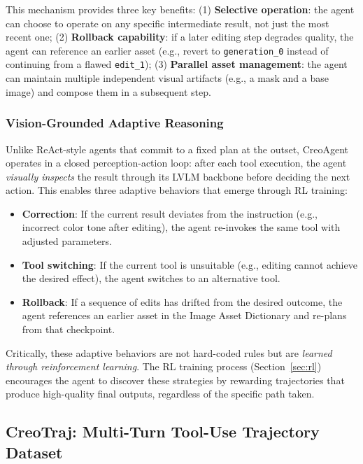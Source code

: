 \documentclass[11pt]{article}
\begin{document}
This mechanism provides three key benefits: (1) \textbf{Selective operation}: the agent can choose to operate on any specific intermediate result, not just the most recent one; (2) \textbf{Rollback capability}: if a later editing step degrades quality, the agent can reference an earlier asset (e.g., revert to \texttt{generation\_0} instead of continuing from a flawed \texttt{edit\_1}); (3) \textbf{Parallel asset management}: the agent can maintain multiple independent visual artifacts (e.g., a mask and a base image) and compose them in a subsequent step.

\subsubsection{Vision-Grounded Adaptive Reasoning}

Unlike ReAct-style agents \cite{yao2022react} that commit to a fixed plan at the outset, CreoAgent operates in a closed perception-action loop: after each tool execution, the agent \textit{visually inspects} the result through its LVLM backbone before deciding the next action. This enables three adaptive behaviors that emerge through RL training:

\begin{itemize}
    \item \textbf{Correction}: If the current result deviates from the instruction (e.g., incorrect color tone after editing), the agent re-invokes the same tool with adjusted parameters.
    \item \textbf{Tool switching}: If the current tool is unsuitable (e.g., editing cannot achieve the desired effect), the agent switches to an alternative tool.
    \item \textbf{Rollback}: If a sequence of edits has drifted from the desired outcome, the agent references an earlier asset in the Image Asset Dictionary and re-plans from that checkpoint.
\end{itemize}

Critically, these adaptive behaviors are not hard-coded rules but are \textit{learned through reinforcement learning}. The RL training process (Section~\ref{sec:rl}) encourages the agent to discover these strategies by rewarding trajectories that produce high-quality final outputs, regardless of the specific path taken.

\subsection{CreoTraj: Multi-Turn Tool-Use Trajectory Dataset}
\end{document}
